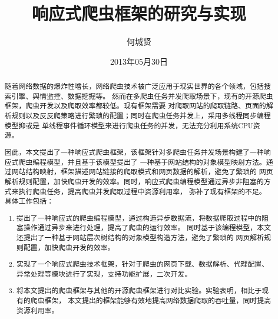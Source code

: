 \documentclass[master]{njuthesis}
\title{响应式爬虫框架的研究与实现}
\author{何城贤}
\institute{南京大学}
\date{2013年05月30日}
\begin{document}

\makenlctitle
\maketitle
\makeenglishtitle


\frontmatter

\begin{abstract}
随着网络数据的爆炸性增长，网络爬虫技术被广泛应用于现实世界的各个领域，包括搜索引擎、舆情监控、数据挖掘等。
然而在多爬虫任务并发爬取场景下，现有的开源爬虫框架，爬虫开发以及爬取效率都较低。现有框架需要
对爬取网站的爬取链路、页面的解析规则以及反反爬策略进行繁琐的配置；同时在爬虫任务并发上，采用多线程同步编程模型抑或是
单线程事件循环模型来进行爬虫任务的并发，无法充分利用系统CPU资源。

因此，本文提出了一种响应式爬虫框架，该框架针对多爬虫任务并发场景构建了一种响应式爬虫编程模型，并且基于该模型提出了
一种基于网站结构的对象模型映射方法。通过网站结构映射，框架描述网站链接的爬取模式和网页数据的解析，避免了繁琐的
网页解析规则配置，加快爬虫开发的效率。同时，响应式爬虫编程模型通过异步非阻塞的方式来执行爬虫任务，提高爬虫并发爬取过程中资源利用率，
弥补了现有框架的不足。
具体工作包括：

\begin{enumerate}

  \item 提出了一种响应式的爬虫编程模型，通过构造异步数据流，将数据爬取过程中的阻塞操作通过异步来进行处理，提高了爬虫的运行效率。
  同时基于该编程模型，本文还提出了一种基于网站层次树结构的对象模型构造方法，避免了繁琐的
网页解析规则配置，加快爬虫开发的效率。

  \item 实现了一个响应式爬虫技术框架，针对于爬虫的网页下载、数据解析、代理配置、异常处理等模块进行了实现，支持功能扩展，二次开发。

  \item 将本文提出的爬虫框架与其他的开源爬虫框架进行对比实验。实验表明，相比于现有的爬虫框架，
  本文提出的框架能够有效地提高网络数据爬取的吞吐量，同时提高资源利用率。
\end{enumerate}

\end{abstract}
\end{document}
